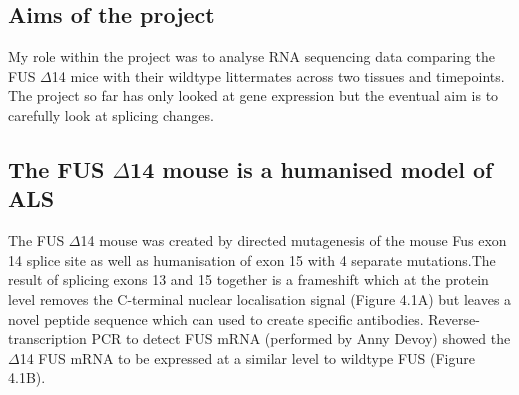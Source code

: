 \subsection{Aims of the project}
My role within the project was to analyse RNA sequencing data comparing the FUS $\Delta$14 mice with their wildtype littermates across two tissues and timepoints. The project so far has only looked at gene expression but the eventual aim is to carefully look at splicing changes.



%

%
%
%

\subsection{The FUS $\Delta$14 mouse is a humanised model of ALS}
The FUS $\Delta$14 mouse was created by directed mutagenesis of the mouse Fus exon 14 splice site as well as humanisation of exon 15 with 4 separate mutations.The result of splicing exons 13 and 15 together is a frameshift which at the protein level removes the C-terminal nuclear localisation signal (Figure 4.1A) but leaves a novel peptide sequence which can used to create specific antibodies. Reverse-transcription PCR to detect FUS mRNA (performed by Anny Devoy) showed the $\Delta$14 FUS mRNA to be expressed at a similar level to wildtype FUS (Figure 4.1B). 


